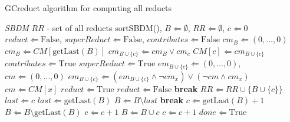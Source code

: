 \documentclass[authoryear,preprint,review,12pt]{elsarticle}
\begin{document}
	\begin{algorithm}
	\footnotesize
	\caption{GCreduct algorithm for computing all reducts}
	\label{alg:GCreduct}
	\begin{algorithmic}[1]
	  \Require \textit{SBDM}
      \Ensure $RR$ - set of all reducts
	  \State sortSBDM(), $B \Leftarrow \emptyset$, $RR \Leftarrow \emptyset$, $c \Leftarrow 0$
	  \State $reduct \Leftarrow \mathrm{False}$, $superReduct \Leftarrow \mathrm{False}$, 
	  		 $contributes \Leftarrow \mathrm{False}$
	  	\label{line:emptyB}
	  		\State $cm_B \Leftarrow (0,...,0)$
	  	\Else
	  		\State $cm_B \Leftarrow CM[\mathrm{getLast}(B)]$\label{line:notEmpty}
	  	\EndIf
	  	\State $cm_{B\cup \lbrace c\rbrace} \Leftarrow cm_B \vee cm_c$\label{line:updateCM}
	  	\State $CM[c] \Leftarrow cm_{B\cup \lbrace c\rbrace}$
	  	\label{line:contrib}
	  		\State $contributes \Leftarrow \mathrm{True}$
	  		\label{line:superReduct}
	  			\State $superReduct \Leftarrow \mathrm{True}$
	  			\State $em_{B\cup \lbrace c\rbrace} \Leftarrow (0,...,0)$, $cm \Leftarrow (0,...,0)$
	  			 \label{line:em}
	  				\State $em_{B\cup \lbrace c\rbrace} \Leftarrow (em_{B\cup \lbrace c\rbrace}\wedge \neg 
	  						cm_x) \vee (\neg cm \wedge cm_x)$
	  				\State $cm \Leftarrow CM[x]$\label{line:emEnd}
	  			\EndFor
	  			\State $reduct \Leftarrow \mathrm{True}$\label{line:reduct}
	  					\State $reduct \Leftarrow \mathrm{False}$
	  					\State \textbf{break}\label{line:reductEnd}
	  				\EndIf
	  			\EndFor
	  				\State $RR \Leftarrow RR \cup \lbrace B\cup \lbrace c\rbrace \rbrace$
	  			\EndIf
	  		\EndIf
	  	\EndIf
	  	 \label{line:cg}
	  		 \label{line:gap}
	  			\State $last \Leftarrow c$
	  				\State $last \Leftarrow \mathrm{getLast}(B)$
	  				\State $B \Leftarrow B\setminus last$
	  					\State \textbf{break}\label{line:gapEnd}
	  				\EndIf
	  			\EndWhile
	  		\EndIf
	  		\State $c \Leftarrow  \mathrm{getLast}(B)+1$
	  		\State $B \Leftarrow B\setminus \mathrm{getLast}(B)$\label{line:remLast}
	  	\Else
	  			\State $c \Leftarrow c+1$\label{line:replaceC}
	  		 \Else
	  			\State $B \Leftarrow B\cup c$\label{line:add1}
	  			\State $c \Leftarrow c+1$\label{line:add1End}
	  		 \EndIf
	  	\EndIf
	  	 \label{line:done}
	  		\State $done \Leftarrow \mathrm{True}$
	  	\EndIf
	  \EndWhile 
	\end{algorithmic}
	\end{algorithm}
\end{document}
